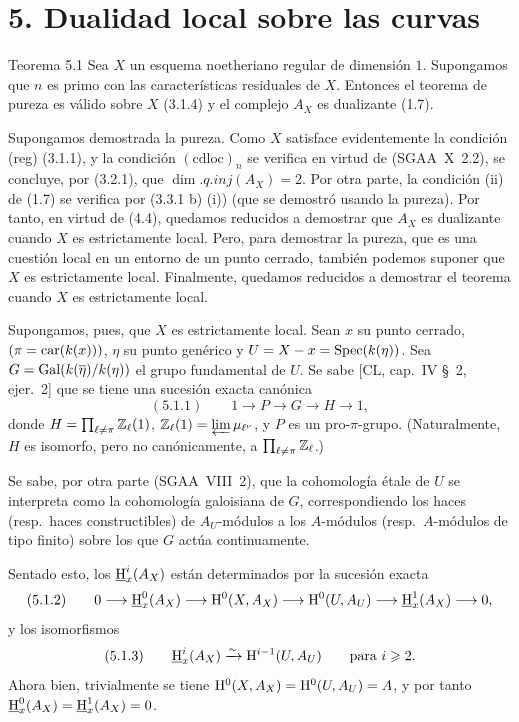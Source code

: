 \section*{5. Dualidad local sobre las curvas}

\begin{statement}{Teorema 5.1}
Sea $X$ un esquema noetheriano regular de dimensión $1$. Supongamos que $n$ es primo con las características residuales de $X$. Entonces el teorema de pureza es válido sobre $X$ (3.1.4) y el complejo $A_X$ es dualizante (1.7).
\end{statement}

\begin{prooftext}[Demostración]
Supongamos demostrada la pureza. Como $X$ satisface evidentemente la condición (reg) (3.1.1), y la condición $(\mathrm{cdloc})_n$ se verifica en virtud de (SGAA~X~2.2), se concluye, por (3.2.1), que $\dim.q.inj(A_X)=2$. Por otra parte, la condición (ii) de (1.7) se verifica por (3.3.1 b) (i)) (que se demostró usando la pureza). Por tanto, en virtud de (4.4), quedamos reducidos a demostrar que $A_X$ es dualizante cuando $X$ es estrictamente local. Pero, para demostrar la pureza, que es una cuestión local en un entorno de un punto cerrado, también podemos suponer que $X$ es estrictamente local. Finalmente, quedamos reducidos a demostrar el teorema cuando $X$ es estrictamente local.

Supongamos, pues, que $X$ es estrictamente local. Sean $x$ su punto cerrado, $(\pi=\operatorname{car}(k(x)))$, $\eta$ su punto genérico y $U=X-x=\operatorname{Spec}(k(\eta))$. Sea $G=\operatorname{Gal}(k(\overline{\eta})/k(\eta))$ el grupo fundamental de $U$. Se sabe [CL, cap.~IV \S~2, ejer.~2] que se tiene una sucesión exacta canónica
\[
(5.1.1)\qquad 1\longrightarrow P\longrightarrow G\longrightarrow H\longrightarrow1,
\]
donde $H=\prod_{\ell\ne\pi}\mathbb{Z}_\ell(1)$, $\mathbb{Z}_\ell(1)=\varprojlim \mu_{\ell^\nu}$, y $P$ es un pro-$\pi$-grupo. (Naturalmente, $H$ es isomorfo, pero no canónicamente, a $\prod_{\ell\ne\pi}\mathbb{Z}_\ell$.)

Se sabe, por otra parte (SGAA~VIII~2), que la cohomología étale de $U$ se interpreta como la cohomología galoisiana de $G$, correspondiendo los haces (resp.~haces constructibles) de $A_U$-módulos a los $A$-módulos (resp.~$A$-módulos de tipo finito) sobre los que $G$ actúa continuamente.

Sentado esto, los $\underline{\mathrm H}_x^i(A_X)$ están determinados por la sucesión exacta
\[
(5.1.2)\qquad 0\longrightarrow \underline{\mathrm H}_x^0(A_X)\longrightarrow \mathrm{H}^0(X,A_X)\longrightarrow \mathrm{H}^0(U,A_U)\longrightarrow \underline{\mathrm H}_x^1(A_X)\longrightarrow0,
\]
y los isomorfismos
\[
(5.1.3)\qquad \underline{\mathrm H}_x^i(A_X)\xrightarrow{\sim}\mathrm{H}^{i-1}(U,A_U)\qquad\text{para }i\geqslant2.
\]
Ahora bien, trivialmente se tiene $\mathrm{H}^0(X,A_X)=\mathrm{H}^0(U,A_U)=A$, y por tanto $\underline{\mathrm H}_x^0(A_X)=\underline{\mathrm H}_x^1(A_X)=0$.


\end{prooftext}
